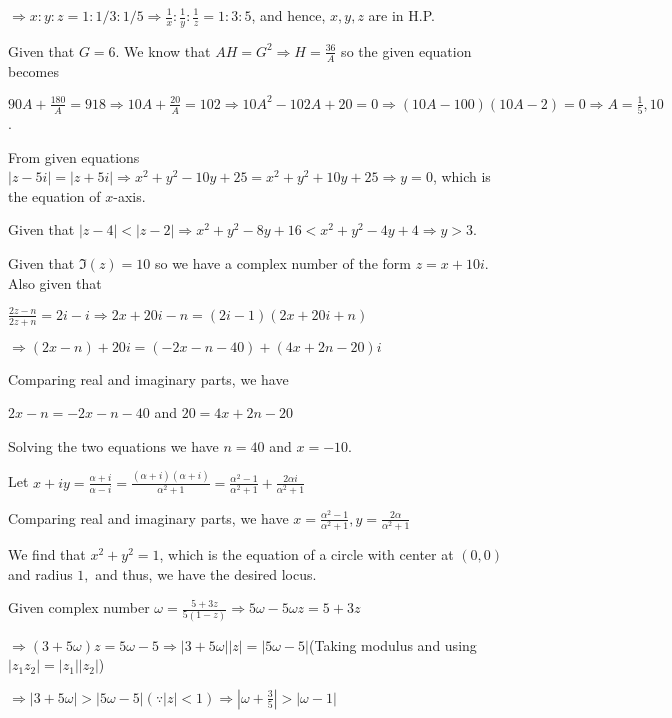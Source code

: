   $\Rightarrow x:y:z = 1:1/3:1/5 \Rightarrow \frac{1}{x}:\frac{1}{y}:\frac{1}{z} = 1:3:5$, and hence, $x,
  y, z$ are in H.P.
\item Given that $G = 6$. We know that $AH = G^2 \Rightarrow H = \frac{36}{A}$ so the given equation becomes

  $90A + \frac{180}{A} = 918 \Rightarrow 10 A + \frac{20}{A} = 102\Rightarrow 10A^2 - 102A + 20 = 0
  \Rightarrow (10A - 100)(10A - 2) = 0 \Rightarrow A = \frac{1}{5}, 10$.
\item From given equations $|z - 5i| = |z + 5i|\Rightarrow x^2 + y^2 - 10y + 25 = x^2 + y^2 + 10y + 25
  \Rightarrow y= 0$, which is the equation of $x$-axis.
\item Given that $|z - 4| < |z - 2| \Rightarrow x^2 + y^2 - 8y + 16 < x^2 + y^2 - 4y + 4\Rightarrow y > 3$.
\item Given that $\Im(z) = 10$ so we have a complex number of the form $z = x + 10i$. Also given that

  $\frac{2z - n}{2z + n} = 2i - i \Rightarrow 2x + 20i - n = (2i - 1)(2x + 20i + n)$

  $\Rightarrow (2x - n) + 20i = (-2x - n - 40) + (4x + 2n - 20)i$

  Comparing real and imaginary parts, we have

  $2x - n = -2x - n - 40$ and $20 = 4x + 2n - 20$

  Solving the two equations we have $n = 40$ and $x = -10$.
\item Let $x + iy = \frac{\alpha + i}{\alpha - i} = \frac{(\alpha + i)(\alpha + i)}{\alpha^2 + 1} =
  \frac{\alpha^2 - 1}{\alpha^2 + 1} + \frac{2\alpha i}{\alpha^2 + 1}$

  Comparing real and imaginary parts, we have $x = \frac{\alpha^2 - 1}{\alpha^2 + 1}, y =
  \frac{2\alpha}{\alpha^2 + 1}$

  We find that $x^2 + y^2 = 1$, which is the equation of a circle with center at $(0, 0)$ and radius $1,$
  and thus, we have the desired locus.
\item Given complex number $\omega = \frac{5 + 3z}{5(1 - z)}\Rightarrow 5\omega - 5\omega z = 5 + 3z$

  $\Rightarrow (3 + 5\omega)z = 5\omega - 5\Rightarrow |3 + 5\omega ||z| = |5\omega - 5|$(Taking modulus and
  using $|z_1z_2| = |z_1||z_2|$)

  $\Rightarrow |3 + 5\omega| > |5\omega - 5|(\because |z| < 1)\Rightarrow \left|\omega + \frac{3}{5}\right|
  > |\omega - 1|$


